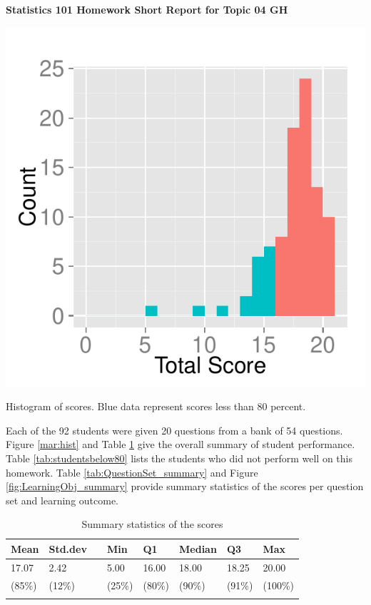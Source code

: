 \documentclass[12pt,english,nohyper]{tufte-handout}\usepackage[]{graphicx}\usepackage[]{color}
\begin{document}
\centerline{\Large\bf Statistics 101 Homework Short Report for Topic 04 GH}
\vspace{1cm}

\begin{marginfigure}
\includegraphics[width=0.98\linewidth]{Topic04_GH_score}
\caption{\label{mar:hist}Histogram of scores. Blue data represent scores less than 80 percent.}
\end{marginfigure}

Each of the 92 students were given 20 questions from a bank of 54 questions. Figure \ref{mar:hist} and Table \ref{tab:summary} give the overall summary of student performance. Table \ref{tab:studentsbelow80} lists the students who did not perform well on this homework. Table \ref{tab:QuestionSet_summary} and Figure \ref{fig:LearningObj_summary} provide summary statistics of the scores per question set and learning outcome.
\bigskip{}

\begin{longtable}{llllllll}
  \hline
Mean & Std.dev &   & Min & Q1 & Median & Q3 & Max \\ 
  \hline
17.07 & 2.42 &  & 5.00 & 16.00 & 18.00 & 18.25 & 20.00 \\ 
  (85\%) & (12\%) &  & (25\%) & (80\%) & (90\%) & (91\%) & (100\%) \\ 
   \hline
\hline
\caption{Summary statistics of the scores} 
\label{tab:summary}
\end{longtable}
\end{document}

